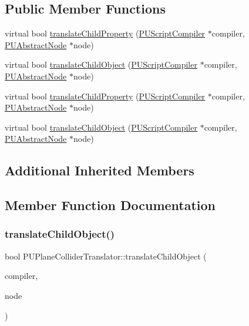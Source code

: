 \subsection*{Public Member Functions}
\begin{DoxyCompactItemize}
\item 
virtual bool \hyperlink{classPUPlaneColliderTranslator_a270c710deb9d9d2a296077f745dfc369}{translate\+Child\+Property} (\hyperlink{classPUScriptCompiler}{P\+U\+Script\+Compiler} $\ast$compiler, \hyperlink{classPUAbstractNode}{P\+U\+Abstract\+Node} $\ast$node)
\item 
virtual bool \hyperlink{classPUPlaneColliderTranslator_a6765ac8b11e3327849351cef91c98d95}{translate\+Child\+Object} (\hyperlink{classPUScriptCompiler}{P\+U\+Script\+Compiler} $\ast$compiler, \hyperlink{classPUAbstractNode}{P\+U\+Abstract\+Node} $\ast$node)
\item 
virtual bool \hyperlink{classPUPlaneColliderTranslator_a772c6f955228702c943cb33cc66af721}{translate\+Child\+Property} (\hyperlink{classPUScriptCompiler}{P\+U\+Script\+Compiler} $\ast$compiler, \hyperlink{classPUAbstractNode}{P\+U\+Abstract\+Node} $\ast$node)
\item 
virtual bool \hyperlink{classPUPlaneColliderTranslator_a7ecd66bfbce9aed23821bead84847c48}{translate\+Child\+Object} (\hyperlink{classPUScriptCompiler}{P\+U\+Script\+Compiler} $\ast$compiler, \hyperlink{classPUAbstractNode}{P\+U\+Abstract\+Node} $\ast$node)
\end{DoxyCompactItemize}
\subsection*{Additional Inherited Members}


\subsection{Member Function Documentation}
\mbox{\label{classPUPlaneColliderTranslator_a6765ac8b11e3327849351cef91c98d95}} 
\subsubsection{\texorpdfstring{translate\+Child\+Object()}{translateChildObject()}\hspace{0.1cm}{\footnotesize\ttfamily [1/2]}}
{\footnotesize\ttfamily bool P\+U\+Plane\+Collider\+Translator\+::translate\+Child\+Object (\begin{DoxyParamCaption}\item[{\hyperlink{classPUScriptCompiler}{P\+U\+Script\+Compiler} $\ast$}]{compiler,  }\item[{\hyperlink{classPUAbstractNode}{P\+U\+Abstract\+Node} $\ast$}]{node }\end{DoxyParamCaption})\hspace{0.3cm}{\ttfamily [virtual]}}

